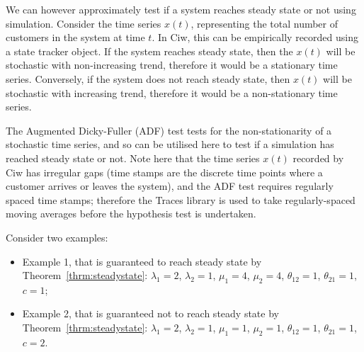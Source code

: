 \documentclass{article}
\begin{document}
We can however approximately test if a system reaches steady state or not using
simulation. Consider the time series $x(t)$, representing the total number of
customers in the system at time $t$. In Ciw, this can be empirically recorded
using a state tracker object. If the system reaches steady state, then the
$x(t)$ will be stochastic with non-increasing trend, therefore it would be a
stationary time series. Conversely, if the system does not reach steady state,
then $x(t)$ will be stochastic with increasing trend, therefore it would be a
non-stationary time series.

The Augmented Dicky-Fuller (ADF) test \cite{dickyfuller79} tests for the
non-stationarity of a stochastic time series, and so can be utilised here to
test if a simulation has reached steady state or not. Note here that the time
series $x(t)$ recorded by Ciw has irregular gaps (time stamps are the discrete
time points where a customer arrives or leaves the system), and the ADF test
requires regularly spaced time stamps; therefore the Traces library
\cite{traces} is used to take regularly-spaced moving averages before the
hypothesis test is undertaken.

Consider two examples:

\begin{itemize}
  \item Example 1, that is guaranteed to reach steady state by
  Theorem~\ref{thrm:steadystate}: $\lambda_1 = 2$, $\lambda_2 = 1$,
  $\mu_1 = 4$, $\mu_2 = 4$, $\theta_{12} = 1$, $\theta_{21} = 1$, $c = 1$;
  \item Example 2, that is guaranteed not to reach steady state by
  Theorem~\ref{thrm:steadystate}: $\lambda_1 = 2$, $\lambda_2 = 1$,
  $\mu_1 = 1$, $\mu_2 = 1$, $\theta_{12} = 1$, $\theta_{21} = 1$, $c = 2$.
\end{itemize}
\end{document}
